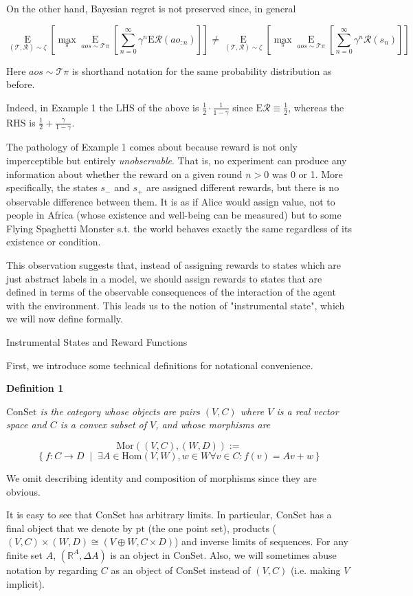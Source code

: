 \documentclass[a4paper]{article}
\newcommand{\Co}[1]{}
\newcommand{\AP}[1]{\left(#1\right)}
\newcommand{\AB}[1]{\left[#1\right]}
\newcommand{\ACM}[2]{\left\{#1\;\middle\vert\;#2\right\}}
\newcommand{\Ea}[2]{\underset{#1}{\operatorname{E}}\AB{#2}}
\newcommand{\Reals}{\mathbb{R}}
\newcommand{\Hom}{\mathrm{Hom}}
\newcommand{\Mor}{\mathrm{Mor}}
\newcommand{\Pt}{\boldsymbol{\mathrm{pt}}}
\newcommand{\R}{\mathcal{R}}
\newcommand{\T}{\mathcal{T}}
\newcommand{\ER}{\mathrm{E}}
\newcommand{\Con}{{\boldsymbol{\mathrm{ConSet}}}}
\begin{document}
On the other hand, Bayesian regret is not preserved since, in general

$$\Ea{(\T,\R)\sim\zeta}{\max_{\pi}\Ea{aos\sim\T\pi}{\sum_{n=0}^\infty\gamma^n\ER\R\AP{ao_{:n}}}}\ne\Ea{(\T,\R)\sim\zeta}{\max_{\pi}\Ea{aos\sim\T\pi}{\sum_{n=0}^\infty\gamma^n\R\AP{s_n}}}$$

Here $aos\sim\T\pi$ is shorthand notation for the same probability distribution as before.

Indeed, in Example 1 the LHS of the above is $\frac{1}{2}\cdot\frac{1}{1-\gamma}$ since $\ER\R\equiv\frac{1}{2}$, whereas the RHS is $\frac{1}{2}+\frac{\gamma}{1-\gamma}$.

The pathology of Example 1 comes about because reward is not only imperceptible but entirely \textit{unobservable}\Co{i}. That is, no experiment can produce any information about whether the reward on a given round $n > 0$ was 0 or 1. More specifically, the states $s_-$ and $s_+$ are assigned different rewards, but there is no observable difference between them. It is as if Alice would assign value, not to people in Africa (whose existence and well-being can be measured) but to some Flying Spaghetti Monster s.t. the world behaves exactly the same regardless of its existence or condition.

This observation suggests that, instead of assigning rewards to states which are just abstract labels in a model, we should assign rewards to states that are defined in terms of the observable consequences of the interaction of the agent with the environment. This leads us to the notion of "instrumental state", which we will now define formally.

\begin{Large}Instrumental States and Reward Functions\end{Large}

First, we introduce some technical definitions for notational convenience.

\textbf{Definition 1}

\textit{$\Con$ is the category whose objects are pairs $(V,C)$ where $V$ is a real vector space and $C$ is a convex subset of $V$, and whose morphisms are}\Co{i}

$$\Mor\AP{(V,C),(W,D)}:=$$
$$\ACM{f:C\rightarrow D}{\exists A \in \Hom(V,W),w\in W \forall v\in C: f(v)=Av+w}$$

We omit describing identity and composition of morphisms since they are obvious.

It is easy to see that $\Con$ has arbitrary limits. In particular, $\Con$ has a final object that we denote by $\Pt$ (the one point set), products ($(V,C)\times(W,D)\cong(V\oplus W,C\times D)$) and inverse limits of sequences. For any finite set $A$, $\AP{\Reals^A,\Delta A}$ is an object in $\Con$. Also, we will sometimes abuse notation by regarding $C$ as an object of $\Con$ instead of $(V,C)$ (i.e. making $V$ implicit).
\end{document}

